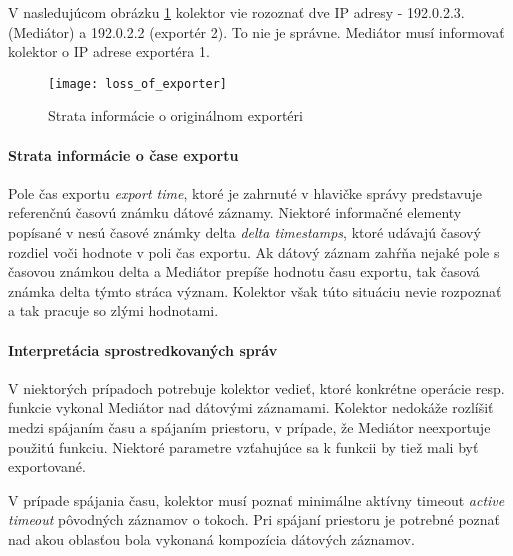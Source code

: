 V nasledujúcom obrázku \ref{o:loss_of_exporter} kolektor vie rozoznať dve IP adresy - 192.0.2.3. (Mediátor) 
a 192.0.2.2 (exportér 2). To nie je správne. Mediátor musí informovať kolektor o IP adrese exportéra 1.

\begin{figure}[ht!]
\centering
\texttt{[image: loss\_of\_exporter]}
\caption{Strata informácie o originálnom exportéri}\label{o:loss_of_exporter}
\end{figure}

\paragraph{Strata informácie o čase exportu} \label{sec:loss_time}

Pole čas exportu \emph{export time}, ktoré je zahrnuté v hlavičke správy predstavuje referenčnú 
časovú známku dátové záznamy. Niektoré informačné elementy popísané v \citep{rfc5102} nesú 
časové známky delta \emph{delta timestamps}, ktoré udávajú časový rozdiel voči hodnote v poli 
čas exportu. Ak dátový záznam zahŕňa nejaké pole s časovou známkou delta a Mediátor prepíše hodnotu 
času exportu,  tak časová známka delta týmto stráca význam. Kolektor však túto situáciu nevie 
rozpoznať a tak pracuje so zlými hodnotami.

%


\paragraph{Interpretácia sprostredkovaných správ}


V niektorých prípadoch potrebuje kolektor vedieť, ktoré konkrétne operácie resp. funkcie vykonal Mediátor 
nad dátovými záznamami. Kolektor nedokáže rozlíšiť medzi spájaním času a spájaním priestoru, v prípade, že 
Mediátor neexportuje použitú funkciu. Niektoré parametre vzťahujúce sa k funkcii by tiež mali byť 
exportované. 

V prípade spájania času, kolektor musí poznať minimálne aktívny timeout \emph{active timeout} 
pôvodných záznamov o tokoch. Pri spájaní priestoru je potrebné poznať nad akou oblasťou bola 
vykonaná kompozícia dátových záznamov.\citep{rfc5982}

%

